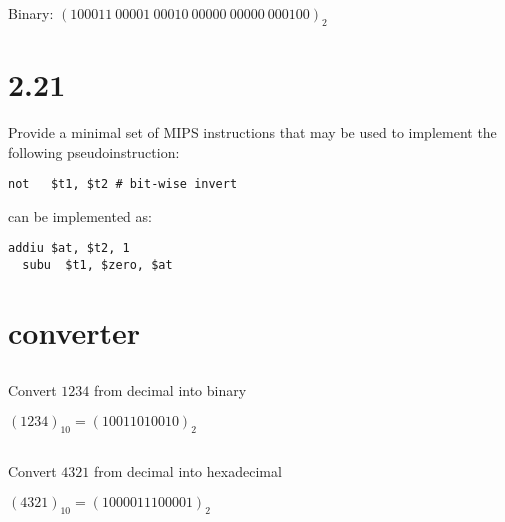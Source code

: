 \documentclass[paper=a4, fontsize=11pt]{scrartcl} %
\begin{document}
Binary: ${(100011\ 00001\ 00010\ 00000\ 00000\ 000100)}_2$


\section{2.21}

\begin{fancyquotes}
  Provide a minimal set of MIPS instructions that may be used to
  implement the following pseudoinstruction:
\end{fancyquotes}

\begin{lstlisting}[language={[mips]Assembler}]
  not	$t1, $t2 # bit-wise invert
\end{lstlisting}                %

can be implemented as:

\begin{lstlisting}[language={[mips]Assembler}]
  addiu	$at, $t2, 1
  subu	$t1, $zero, $at
\end{lstlisting}                %


\section{converter}

\subsection{}
\begin{fancyquotes}
  Convert $1234$ from decimal into binary
\end{fancyquotes}

${(1234)}_{10} = {(10011010010)}_2$

\subsection{}
\begin{fancyquotes}
  Convert $4321$ from decimal into hexadecimal
\end{fancyquotes}

${(4321)}_{10} = {(1000011100001)}_2$
\end{document}
